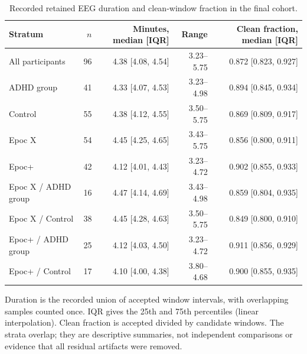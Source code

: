\begin{table}[!htbp]
\centering\small
\caption{Recorded retained EEG duration and clean-window fraction in the final cohort.}
\label{tab:duration}
\begin{tabular}{lrrrr}
\toprule
Stratum & $n$ & Minutes, median [IQR] & Range & Clean fraction, median [IQR]\\
\midrule
All participants & 96 & 4.38 [4.08, 4.54] & 3.23--5.75 & 0.872 [0.823, 0.927]\\
ADHD group & 41 & 4.33 [4.07, 4.53] & 3.23--4.98 & 0.894 [0.845, 0.934]\\
Control & 55 & 4.38 [4.12, 4.55] & 3.50--5.75 & 0.869 [0.809, 0.917]\\
Epoc X & 54 & 4.45 [4.25, 4.65] & 3.43--5.75 & 0.856 [0.800, 0.911]\\
Epoc+ & 42 & 4.12 [4.01, 4.43] & 3.23--4.72 & 0.902 [0.855, 0.933]\\
Epoc X / ADHD group & 16 & 4.47 [4.14, 4.69] & 3.43--4.98 & 0.859 [0.804, 0.935]\\
Epoc X / Control & 38 & 4.45 [4.28, 4.63] & 3.50--5.75 & 0.849 [0.800, 0.910]\\
Epoc+ / ADHD group & 25 & 4.12 [4.03, 4.50] & 3.23--4.72 & 0.911 [0.856, 0.929]\\
Epoc+ / Control & 17 & 4.10 [4.00, 4.38] & 3.80--4.68 & 0.900 [0.855, 0.935]\\
\bottomrule
\end{tabular}
\par\smallskip\begin{minipage}{\textwidth}\footnotesize
Duration is the recorded union of accepted window intervals, with overlapping samples counted once. IQR gives the 25th and 75th percentiles (linear interpolation). Clean fraction is accepted divided by candidate windows. The strata overlap; they are descriptive summaries, not independent comparisons or evidence that all residual artifacts were removed.
\end{minipage}
\end{table}
